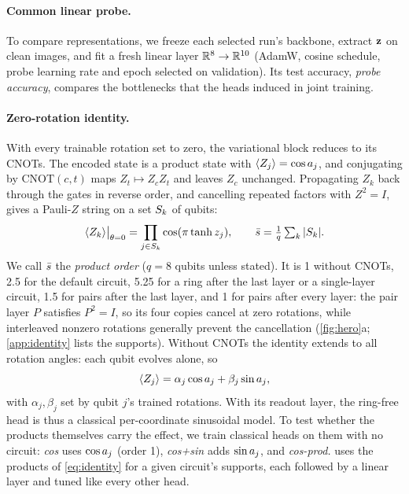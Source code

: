 \paragraph{Common linear probe.}
To compare representations, we freeze each selected run's backbone, extract $\mathbf{z}$ on clean
images, and fit a fresh linear layer $\mathbb{R}^8\to\mathbb{R}^{10}$ (AdamW, cosine schedule, probe
learning rate and epoch selected on validation). Its test accuracy, \emph{probe accuracy},
compares the bottlenecks that the heads induced in joint training.

\paragraph{Zero-rotation identity.}
With every trainable rotation set to zero, the variational block reduces to its CNOTs. The
encoded state is a product state with $\langle Z_j\rangle=\cos a_{j}$, and conjugating by
$\mathrm{CNOT}(c,t)$ maps $Z_t\mapsto Z_cZ_t$ and leaves $Z_c$ unchanged. Propagating $Z_k$
back through the gates in reverse order, and cancelling repeated factors with $Z^2=I$, gives
a Pauli-$Z$ string on a set $S_k$ of qubits:
\begin{equation}
  \langle Z_{k}\rangle\big|_{\theta=0}=\prod_{j\in S_k}\cos(\pi\tanh z_j),
  \qquad
  \bar{s}=\tfrac{1}{q}\textstyle\sum_{k}|S_k| .
  \label{eq:identity}
\end{equation}
We call $\bar{s}$ the \emph{product order} ($q=8$ qubits unless stated). It is 1 without CNOTs, 2.5 for the default
circuit, 5.25 for a ring after the last layer or a single-layer circuit, 1.5 for pairs after
the last layer, and 1 for pairs after every layer: the pair layer $P$ satisfies $P^2=I$, so its four
copies cancel at zero rotations, while interleaved nonzero rotations generally prevent the
cancellation (\cref{fig:hero}a; \cref{app:identity} lists the supports). Without
CNOTs the identity extends to all rotation angles: each qubit evolves alone, so
\begin{equation}
  \langle Z_{j}\rangle=\alpha_j\cos a_{j}+\beta_j\sin a_{j},
  \label{eq:ringfree}
\end{equation}
with $\alpha_j,\beta_j$ set by qubit $j$'s trained rotations. With its readout layer, the
ring-free head is thus a classical per-coordinate sinusoidal model. To test whether the products themselves carry the effect, we train classical
heads on them with no circuit: \emph{cos} uses $\cos a_{j}$ (order 1), \emph{cos+sin} adds
$\sin a_{j}$, and \emph{cos-prod.} uses the products of \cref{eq:identity} for a given
circuit's supports, each followed by a linear layer and tuned like every other head.
